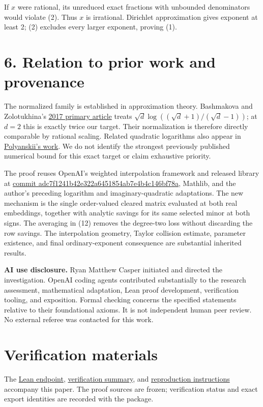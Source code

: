 \documentclass[11pt]{article}
\begin{document}
If \(x\) were rational, its unreduced exact fractions with unbounded
denominators would violate (2). Thus \(x\) is irrational. Dirichlet
approximation gives exponent at least 2; (2) excludes every larger
exponent, proving (1).

\section{6. Relation to prior work and
provenance}\label{relation-to-prior-work-and-provenance}

The normalized family is established in approximation theory. Bashmakova
and Zolotukhina's \href{https://www.mathnet.ru/eng/cheb531}{2017 primary
article} treats \(\sqrt d\log((\sqrt d+1)/(\sqrt d-1))\); at \(d=2\)
this is exactly twice our target. Their normalization is therefore
directly comparable by rational scaling. Related quadratic logarithms
also appear in \href{https://arxiv.org/abs/1501.06752}{Polyanskii's
work}. We do not identify the strongest previously published numerical
bound for this exact target or claim exhaustive priority.

The proof reuses OpenAI's weighted interpolation framework and released
library at
\href{https://github.com/openai/math/tree/adc7f1241b42e322a6451854ab7e4b4c146bf78a}{commit
adc7f1241b42e322a6451854ab7e4b4c146bf78a}, Mathlib, and the author's
preceding logarithm and imaginary-quadratic adaptations. The new
mechanism is the single order-valued cleared matrix evaluated at both
real embeddings, together with analytic savings for its same selected
minor at both signs. The averaging in (12) removes the degree-two loss
without discarding the row savings. The interpolation geometry, Taylor
collision estimate, parameter existence, and final ordinary-exponent
consequence are substantial inherited results.

\textbf{AI use disclosure.} Ryan Matthew Casper initiated and directed
the investigation. OpenAI coding agents contributed substantially to the
research assessment, mathematical adaptation, Lean proof development,
verification tooling, and exposition. Formal checking concerns the
specified statements relative to their foundational axioms. It is not
independent human peer review. No external referee was contacted for
this work.

\section{Verification materials}\label{verification-materials}

The \href{lean/RealNorm/Main.lean}{Lean endpoint},
\href{lean/VERIFICATION.md}{verification summary}, and
\href{VERIFY.md}{reproduction instructions} accompany this paper. The
proof sources are frozen; verification status and exact export
identities are recorded with the package.
\end{document}
